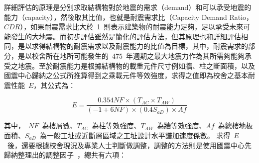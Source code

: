 詳細評估的原理是分別求取結構物對於地震的需求（demand）和可以承受地震的能力（capacity），然後取其比值，也就是耐震需求比（Capacity Demand Ratio，$CDR$），如果耐震需求比大於~1~則表示建築物的耐震能力足夠，足以承受未來可能發生的大地震。而初步評估雖然是簡化的評估方法，但其原理也和詳細評估相同，是以求得結構物的耐震需求以及耐震能力的比值為目標，其中，耐震需求的部分，是以校舍所在地所可能發生的~475~年週期之最大地震力作為其所需夠能夠承受之地震。至於耐震能力是根據結構物的載重元件尺寸例如牆、柱之斷面積，以及國震中心歸納之公式所推算得到之乘載元件等效強度，求得之值即為校舍之基本耐震性能~$E$，其公式為：

  \begin{equation}E = \dfrac{ 0.354 NF \times (T_{AC} \times T_{AW}) }{(-1 + 6 NF) \times (0.4 S_{aD}) \times Af} \end{equation} 

其中，~$NF$~為樓層數、$T_{AC}$~為柱等效強度、$T_{AW}$~為牆等效強度、$Af$~為總樓地板面積、$S_{aD}$~為一般工址或近斷層區域之工址設計水平譜加速度係數。
求得~$E$~後，還要根據校舍現況及專業人士判斷做調整，調整的方法則是使用國震中心先歸納整理出的調整因子~\cite{ncree03049}，總共有六項：


